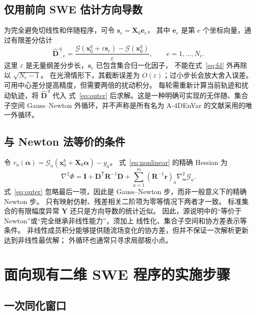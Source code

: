 \documentclass[11pt,a4paper]{article}
\newcommand{\T}{\mathsf T}
\newcommand{\Id}{\mathbf I}
\newcommand{\xx}{\mathbf x}
\newcommand{\avec}{\bm\alpha}
\begin{document}
\subsection{仅用前向 SWE 估计方向导数}

为完全避免切线性和伴随程序，可令 $\mathbf s_e=\mathbf X_0\mathbf e_e$，
其中 $\mathbf e_e$ 是第 $e$ 个坐标向量，通过有限差分估计
\begin{equation}
 \widehat{\mathbf D}^{\,q}_{:,e}
 =\frac{\mathcal G(\xx_0^q+\varepsilon\mathbf s_e)
              -\mathcal G(\xx_0^q)}{\varepsilon},
 \qquad e=1,\ldots,N_e.
 \label{eq:fd}
\end{equation}
这里 $\varepsilon$ 是无量纲差分步长，$\mathbf s_e$ 已包含集合归一化因子，
不能在式~\eqref{eq:fd} 外再除以 $\sqrt{N_e-1}$。
在光滑情形下，其截断误差为 $O(\varepsilon)$；过小步长会放大舍入误差。
可用中心差分提高精度，但需要两倍的扰动积分。
每轮需重新计算当前轨迹和扰动轨迹，将 $\widehat{\mathbf D}^{\,q}$ 代入
式~\eqref{eq:outer} 后求解。这是一种明确可实现的无伴随、集合子空间
Gauss--Newton 外循环，并不声称是所有名为 A-4DEnVar 的文献采用的唯一外循环。

\subsection{与 Newton 法等价的条件}

令 $r_a(\avec)=\mathcal G_a(\xx_0^b+\mathbf X_0\avec)-y_a$。
式~\eqref{eq:nonlinear} 的精确 Hessian 为
\begin{equation}
 \nabla^2\Phi
 =\Id+\mathbf D^\T\mathbf R^{-1}\mathbf D
 +\sum_{a=1}^m(\mathbf R^{-1}\mathbf r)_a\nabla^2_{\avec}\mathcal G_a.
 \label{eq:newton}
\end{equation}
式~\eqref{eq:outer} 忽略最后一项，因此是 Gauss--Newton 步，而非一般意义下的精确 Newton 步。
只有映射仿射、残差相关二阶项为零等情况下两者才一致。
标准集合的有限幅度异常 $\mathbf Y$ 还只是方向导数的统计近似。
因此，源说明中的“等价于 Newton”或“完全继承非线性能力”，须加上
线性化、集合子空间和协方差表示等条件。
非线性成员积分能够提供随流场变化的协方差，但并不保证一次解析更新达到非线性最优解；
外循环也通常只寻求局部极小点。

\section{面向现有二维 SWE 程序的实施步骤}

\subsection{一次同化窗口}
\end{document}
